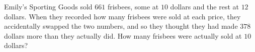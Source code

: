 Emily's Sporting Goods sold $661$ frisbees, some at $10$ dollars and the rest at $12$ dollars. When they recorded how many frisbees were sold at each price, they accidentally swapped the two numbers, and so they thought they had made $378$ dollars more than they actually did. How many frisbees were actually sold at $10$ dollars?
